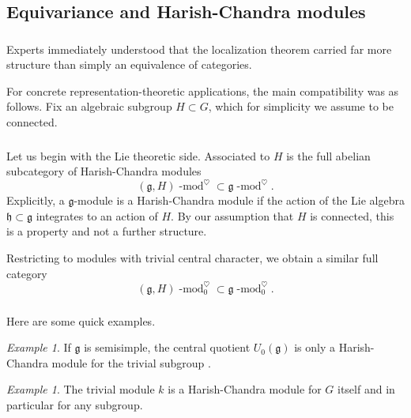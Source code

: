 \documentclass[10pt]{amsart}
\newcommand{\fg}{\mathfrak{g}}
\newcommand{\fh}{\mathfrak{h}}
\newcommand{\on}{\operatorname}
\renewcommand{\mod}{\on{-mod}}
\theoremstyle{remark}
\newtheorem{ex}[subsubsection]{Example}
\numberwithin{equation}{section}
\renewcommand{\mod}{\operatorname{-mod}}
\begin{document}
	
	
	
	
	
	
	\subsection{Equivariance and Harish-Chandra modules}
	
	\subsubsection{}Experts immediately understood that the localization theorem 
	carried far more 
	structure than simply an equivalence of categories. 
	
	For concrete 
	representation-theoretic applications, the main compatibility was as 
	follows. 
	Fix an algebraic subgroup $H \subset G$, which for simplicity we assume to 
	be 
	connected.
	
	\subsubsection{} Let us begin with the Lie theoretic side. Associated to 
	$H$ is 
	the full abelian subcategory of Harish-Chandra modules
	\[
	(\fg,H)\mod^\heartsuit \subset \fg\mod^\heartsuit. 
	\]
	Explicitly, a $\fg$-module is a Harish-Chandra module if the action of the 
	Lie algebra $\fh \subset \fg$ integrates to an action of $H$.  By our 
	assumption that $H$ is connected, this is a property and 
	not a further structure. 
	
	
	Restricting to modules with trivial central character, we obtain a similar 
	full 
	category 
	\[
	(\fg, H)\mod_0^\heartsuit \subset \fg\mod_0^\heartsuit. 
	\]
	
	
	\subsubsection{}Here are some quick examples. 
	
	\begin{ex} 
		If $\fg$ is semisimple, the central quotient $U_0(\fg)$ is only a Harish-Chandra module for 
		the 
		trivial subgroup . 
	\end{ex}
	
	\begin{ex} The trivial module $k$ is a Harish-Chandra module for $G$ 
	itself and in particular for any subgroup. 
	\end{ex}	
	
\end{document}
